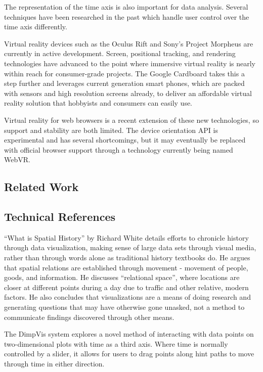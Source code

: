 \documentclass[conference]{acmsiggraph}
\begin{document}
The representation of the time axis is also important for data analysis.
Several techniques have been researched in the past which handle user control
over the time axis differently.

Virtual reality devices such as the Oculus Rift and Sony's Project Morpheus are
currently in active development. Screen, positional tracking, and rendering
technologies have advanced to the point where immersive virtual reality is
nearly within reach for consumer-grade projects. The Google Cardboard takes this
a step further and leverages current generation smart phones, which are packed
with sensors and high resolution screens already, to deliver an affordable
virtual reality solution that hobbyists and consumers can easily use.

Virtual reality for web browsers is a recent extension of these new
technologies, so support and stability are both limited. The device orientation
API is experimental and has several shortcomings, but it may eventually be
replaced with official browser support through a technology currently being
named WebVR.


\subsection{Related Work}

\subsection{Technical References}

``What is Spatial History'' by Richard White \cite{White} details efforts to
chronicle history through data visualization, making sense of large data sets
through visual media, rather than through words alone as traditional history
textbooks do. He argues that spatial relations are established through movement
- movement of people, goods, and information. He discusses
``relational space'', where locations are closer at different points during a
day due to traffic and other relative, modern factors. He also concludes that
visualizations are a means of doing research and generating questions that may
have otherwise gone unasked, not a method to communicate findings discovered
through other means.

The DimpVis system \cite{10.1109/TVCG.2014.2346250} explores a novel method of
interacting with data points on two-dimensional plots with time as a third
axis. Where time is normally controlled by a slider, it allows for users to
drag points along hint paths to move through time in either direction.
\end{document}
